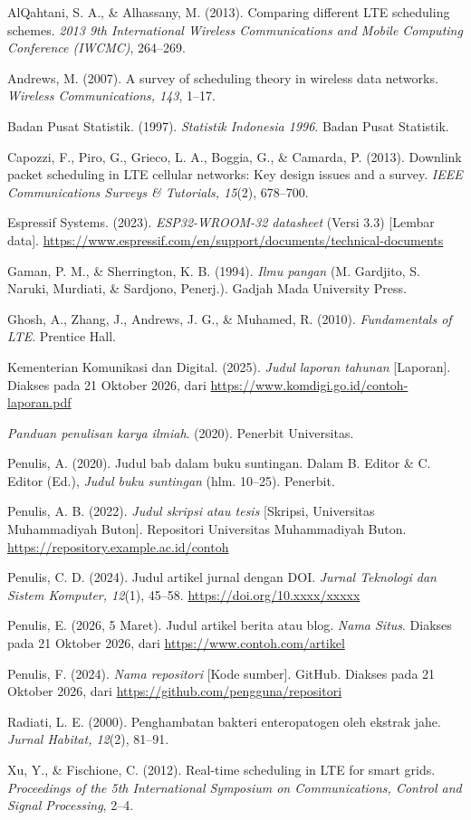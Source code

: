 \begin{pustaka}
AlQahtani, S. A., \& Alhassany, M. (2013). Comparing different LTE scheduling schemes. \textit{2013 9th International Wireless Communications and Mobile Computing Conference (IWCMC)}, 264--269.

Andrews, M. (2007). A survey of scheduling theory in wireless data networks. \textit{Wireless Communications, 143}, 1--17.

Badan Pusat Statistik. (1997). \textit{Statistik Indonesia 1996}. Badan Pusat Statistik.

Capozzi, F., Piro, G., Grieco, L. A., Boggia, G., \& Camarda, P. (2013). Downlink packet scheduling in LTE cellular networks: Key design issues and a survey. \textit{IEEE Communications Surveys \& Tutorials, 15}(2), 678--700.

Espressif Systems. (2023). \textit{ESP32-WROOM-32 datasheet} (Versi 3.3) [Lembar data]. \url{https://www.espressif.com/en/support/documents/technical-documents}

Gaman, P. M., \& Sherrington, K. B. (1994). \textit{Ilmu pangan} (M. Gardjito, S. Naruki, Murdiati, \& Sardjono, Penerj.). Gadjah Mada University Press.

Ghosh, A., Zhang, J., Andrews, J. G., \& Muhamed, R. (2010). \textit{Fundamentals of LTE}. Prentice Hall.

Kementerian Komunikasi dan Digital. (2025). \textit{Judul laporan tahunan} [Laporan]. Diakses pada 21 Oktober 2026, dari \url{https://www.komdigi.go.id/contoh-laporan.pdf}

\textit{Panduan penulisan karya ilmiah}. (2020). Penerbit Universitas.

Penulis, A. (2020). Judul bab dalam buku suntingan. Dalam B. Editor \& C. Editor (Ed.), \textit{Judul buku suntingan} (hlm. 10--25). Penerbit.

Penulis, A. B. (2022). \textit{Judul skripsi atau tesis} [Skripsi, Universitas Muhammadiyah Buton]. Repositori Universitas Muhammadiyah Buton. \url{https://repository.example.ac.id/contoh}

Penulis, C. D. (2024). Judul artikel jurnal dengan DOI. \textit{Jurnal Teknologi dan Sistem Komputer, 12}(1), 45--58. \url{https://doi.org/10.xxxx/xxxxx}

Penulis, E. (2026, 5 Maret). Judul artikel berita atau blog. \textit{Nama Situs}. Diakses pada 21 Oktober 2026, dari \url{https://www.contoh.com/artikel}

Penulis, F. (2024). \textit{Nama repositori} [Kode sumber]. GitHub. Diakses pada 21 Oktober 2026, dari \url{https://github.com/pengguna/repositori}

Radiati, L. E. (2000). Penghambatan bakteri enteropatogen oleh ekstrak jahe. \textit{Jurnal Habitat, 12}(2), 81--91.

Xu, Y., \& Fischione, C. (2012). Real-time scheduling in LTE for smart grids. \textit{Proceedings of the 5th International Symposium on Communications, Control and Signal Processing}, 2--4.
\end{pustaka}
